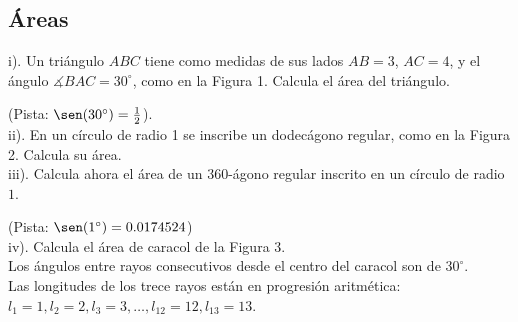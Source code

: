  
\begin{multicols}{2}
\section*{Áreas}

i). Un triángulo $ABC$ tiene como medidas de sus lados $AB=3$, $AC=4$, y el ángulo $\measuredangle BAC=30^{\circ}$, como en la Figura 1. Calcula el área del triángulo. 

(Pista: $\sen(30^{\circ})=\frac{1}{2}$).\\

ii). En un círculo de radio 1 se inscribe un dodecágono regular, como en la Figura 2. Calcula su área.\\

iii). Calcula ahora el área de un $360$-ágono regular inscrito en un círculo de radio $1$. 

(Pista: $\sen(1^{\circ})=0.0174524$)\\

iv). Calcula el área de caracol de la Figura 3.\\

Los ángulos entre rayos consecutivos desde el centro del caracol son de $30^{\circ}$.\\

Las longitudes de los trece rayos están en progresión aritmética: \\

$l_1=1, l_2=2, l_3=3, \dots, l_{12}=12, l_{13}=13$. 




\end{multicols}
